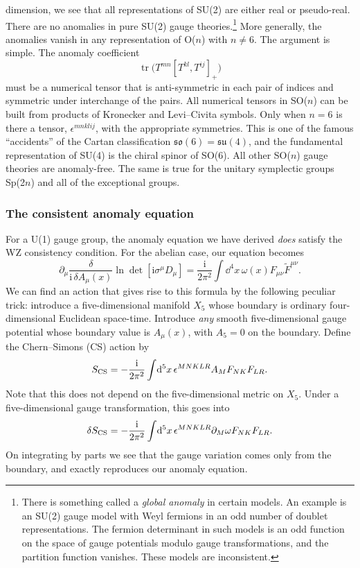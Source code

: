 dimension, we see that all representations of SU(2) are either real or
pseudo-real. There are no anomalies in pure SU(2) gauge theories.\footnote[16]{There
is something called a \emph{global anomaly} \cite{banks-ref-107} in certain models. An
example is an SU(2) gauge model with Weyl fermions in an odd number of
doublet representations. The fermion determinant in such models is an odd
function on the space of gauge potentials modulo gauge transformations, and
the partition function vanishes. These models are inconsistent.} More
generally, the anomalies vanish in any representation of O($n$) with $n\ne6$.
The argument is simple. The anomaly coefficient
\[
  \operatorname{tr}\bigl(T^{mn}[T^{kl},T^{ij}]_+\bigr)
\]
must be a numerical tensor that is anti-symmetric in each pair of indices and
symmetric under interchange of the pairs. All numerical tensors in SO($n$)
can be built from products of Kronecker and Levi--Civita symbols. Only when
$n=6$ is there a tensor, $\epsilon^{mnklij}$, with the appropriate symmetries.
This is one of the famous ``accidents'' of the Cartan classification
$\mathfrak{so}(6)=\mathfrak{su}(4)$, and the fundamental representation of
SU(4) is the chiral spinor of SO(6). All other SO($n$) gauge theories are
anomaly-free. The same is true for the unitary symplectic groups Sp(2$n$) and
all of the exceptional groups.


\subsubsection{The consistent anomaly equation}

For a U(1) gauge group, the anomaly equation we have derived \emph{does}
satisfy the WZ consistency condition. For the abelian case, our equation
becomes
\[
  \partial_\mu\frac{\delta}{\mathrm{i}\,\delta A_\mu(x)}
  \ln\det[\mathrm{i}\sigma^\mu D_\mu]
  =\frac{\mathrm{i}}{2\pi^2}\int\!\dd^4x\,
  \omega(x)F_{\mu\nu}\widetilde F^{\mu\nu} .
\]
We can find an action that gives rise to this formula by the following peculiar
trick: introduce a five-dimensional manifold $X_5$ whose boundary is ordinary
four-dimensional Euclidean space-time. Introduce \emph{any} smooth
five-dimensional gauge potential whose boundary value is $A_\mu(x)$, with
$A_5=0$ on the boundary. Define the Chern--Simons (CS) action by
\[
  S_{\rm CS}=-\frac{\mathrm{i}}{2\pi^2}
  \int\!\mathop{}\!\mathrm{d}^5x\,\epsilon^{MNKLR}A_MF_{NK}F_{LR} .
\]
Note that this does not depend on the five-dimensional metric on $X_5$. Under
a five-dimensional gauge transformation, this goes into
\[
  \delta S_{\rm CS}=-\frac{\mathrm{i}}{2\pi^2}
  \int\!\mathop{}\!\mathrm{d}^5x\,\epsilon^{MNKLR}\partial_M\omega F_{NK}F_{LR} .
\]
On integrating by parts we see that the gauge variation comes only from the
boundary, and exactly reproduces our anomaly equation.

